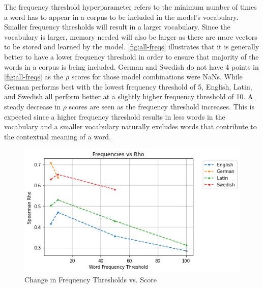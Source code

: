 The frequency threshold hyperparameter refers to the minimum number of times a word has to appear in a corpus to be included in the model’s vocabulary. Smaller frequency thresholds will result in a larger vocabulary. Since the vocabulary is larger, memory needed will also be larger as there are more vectors to be stored and learned by the model.  \autoref{fig:all-freqs} illustrates that it is generally better to have a lower frequency threshold in order to ensure that majority of the words in a corpus is being included. German and Swedish do not have 4 points in \autoref{fig:all-freqs} as the $\rho$ scores for those model combinations were NaNs. While German performs best with the lowest frequency threshold of 5, English, Latin, and Swedish all perform better at a slightly higher frequency threshold of 10. A steady decrease in $\rho$ scores are seen as the frequency threshold increases. This is expected since a higher frequency threshold results in less words in the vocabulary and a smaller vocabulary naturally excludes words that contribute to the contextual meaning of a word. 

\begin{figure}[h]
  \centering
  \includegraphics[width=.8\linewidth]{sections/figures/freqs_all.png}
  \caption{Change in Frequency Thresholds vs. Score}
  \label{fig:all-freqs}
\end{figure}

